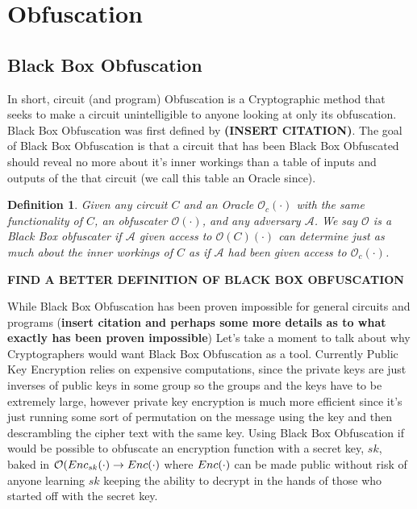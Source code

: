 \documentclass[12pt,twoside]{reedthesis}
\newtheorem{definition}{Definition}
\begin{document}
    \section{Obfuscation}
    
    \subsection{Black Box Obfuscation}
    In short, circuit (and program) Obfuscation is a Cryptographic method that seeks to make a circuit
    unintelligible to anyone looking at only its obfuscation. Black Box Obfuscation was first defined by
    \textbf{(INSERT CITATION)}. The goal of Black Box Obfuscation is that a circuit that has been Black Box Obfuscated should reveal no more about it's inner workings than a table of inputs and outputs of the that circuit (we call this table an Oracle since).
    
    \begin{definition}
    Given any circuit $C$ and an Oracle $\mathcal{O}_c(\cdot)$ with the same functionality of $C$, an obfuscater $\mathcal{O}(\cdot)$, and any adversary $\mathcal{A}$. We say $\mathcal{O}$ is a Black Box obfuscater if $\mathcal{A}$ given access to $\mathcal{O}(C)(\cdot)$ can determine just as much about the inner workings of $C$ as if $\mathcal{A}$ had been given access to $\mathcal{O}_c(\cdot)$.
   
    
    \end{definition}
    
    \begin{center}
    \textbf{ FIND A BETTER DEFINITION OF BLACK BOX OBFUSCATION}
    \end{center}
    
    \par While Black Box Obfuscation has been proven impossible for general circuits and programs (\textbf{insert citation and perhaps some more details as to what exactly has been proven impossible}) Let's take a moment to talk about why Cryptographers would want Black Box Obfuscation as a tool. Currently Public Key Encryption relies on expensive computations, since the private keys are just 
    inverses of public keys in some group so the groups and the keys have to be extremely large, however private key encryption is much more efficient since it's just running some sort of permutation on the message using the key and then descrambling the cipher text with the same key. Using Black 
    Box Obfuscation if would be possible to obfuscate an encryption function with a secret key, $sk$, baked in $\mathcal{O}(Enc_{sk}(\cdot) \rightarrow Enc(\cdot)$ where $Enc(\cdot)$ can be made public without risk of anyone learning $sk$ keeping the ability to decrypt in the hands of those who started off with the secret key.
    
\end{document}
